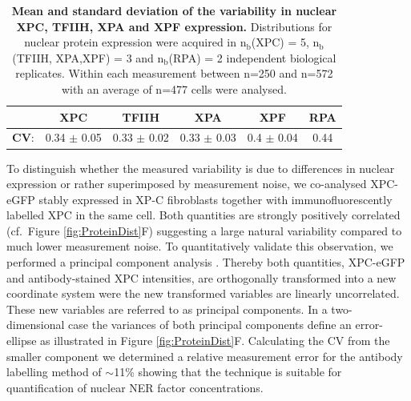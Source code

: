 \begin{table}[t!]
	\centering
	\begin{tabular}{cccccc}
		\hline
		\rule{0pt}{2ex}
		&\textbf{XPC} & \textbf{TFIIH} & \textbf{XPA} & \textbf{XPF} & \textbf{RPA}\\ \hline
		\rule{0pt}{3ex}
		\textbf{CV}: & 0.34 $\pm$ 0.05 & 0.33 $\pm$ 0.02 & 0.33 $\pm$ 0.03 & 0.4 $\pm$ 0.04 & 0.44\\ \hline
		
	\end{tabular}
	\caption{\textbf{Mean and standard deviation of the variability in nuclear XPC, TFIIH, XPA and XPF expression.} Distributions for nuclear protein expression were acquired in $\text{n}_\text{b}$(XPC) = 5, $\text{n}_\text{b}$(TFIIH, XPA,XPF) = 3 and $\text{n}_\text{b}$(RPA) = 2 independent biological replicates. Within each measurement between n=250 and n=572 with an average of n=477 cells were analysed.}\label{tab:proteinVariability}
\end{table}      

To distinguish whether the measured variability is due to differences in nuclear expression or rather superimposed by measurement noise, we co-analysed XPC-eGFP stably expressed in XP-C fibroblasts together with immunofluorescently labelled XPC in the same cell. Both quantities are strongly positively correlated (cf.\ Figure \ref{fig:ProteinDist}F) suggesting a large natural variability compared to much lower measurement noise. To quantitatively validate this observation, we performed a principal component analysis \cite{Pearson1901}. Thereby both quantities, XPC-eGFP and antibody-stained XPC intensities, are orthogonally transformed into a new coordinate system were the new transformed variables are linearly uncorrelated. These new variables are referred to as principal components. In a two-dimensional case the variances of both principal components define an error-ellipse as illustrated in Figure \ref{fig:ProteinDist}F. Calculating the CV from the smaller component we determined a relative measurement error for the antibody labelling method of $\sim$11\% showing that the technique is suitable for quantification of nuclear NER factor concentrations.       

